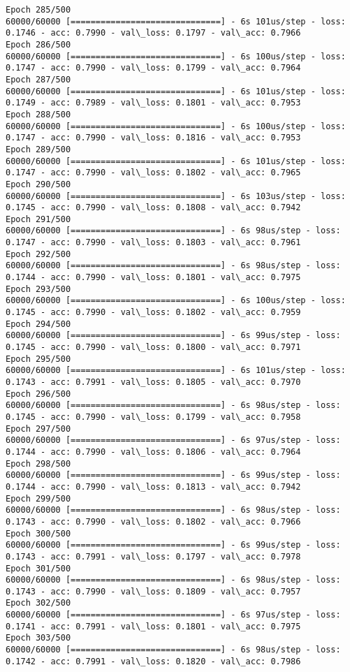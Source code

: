 \documentclass[11pt]{article}
\begin{document}
\begin{Verbatim}[commandchars=\\\{\}]
Epoch 285/500
60000/60000 [==============================] - 6s 101us/step - loss: 0.1746 - acc: 0.7990 - val\_loss: 0.1797 - val\_acc: 0.7966
Epoch 286/500
60000/60000 [==============================] - 6s 100us/step - loss: 0.1747 - acc: 0.7990 - val\_loss: 0.1799 - val\_acc: 0.7964
Epoch 287/500
60000/60000 [==============================] - 6s 101us/step - loss: 0.1749 - acc: 0.7989 - val\_loss: 0.1801 - val\_acc: 0.7953
Epoch 288/500
60000/60000 [==============================] - 6s 100us/step - loss: 0.1747 - acc: 0.7990 - val\_loss: 0.1816 - val\_acc: 0.7953
Epoch 289/500
60000/60000 [==============================] - 6s 101us/step - loss: 0.1747 - acc: 0.7990 - val\_loss: 0.1802 - val\_acc: 0.7965
Epoch 290/500
60000/60000 [==============================] - 6s 103us/step - loss: 0.1745 - acc: 0.7990 - val\_loss: 0.1808 - val\_acc: 0.7942
Epoch 291/500
60000/60000 [==============================] - 6s 98us/step - loss: 0.1747 - acc: 0.7990 - val\_loss: 0.1803 - val\_acc: 0.7961
Epoch 292/500
60000/60000 [==============================] - 6s 98us/step - loss: 0.1744 - acc: 0.7990 - val\_loss: 0.1801 - val\_acc: 0.7975
Epoch 293/500
60000/60000 [==============================] - 6s 100us/step - loss: 0.1745 - acc: 0.7990 - val\_loss: 0.1802 - val\_acc: 0.7959
Epoch 294/500
60000/60000 [==============================] - 6s 99us/step - loss: 0.1745 - acc: 0.7990 - val\_loss: 0.1800 - val\_acc: 0.7971
Epoch 295/500
60000/60000 [==============================] - 6s 101us/step - loss: 0.1743 - acc: 0.7991 - val\_loss: 0.1805 - val\_acc: 0.7970
Epoch 296/500
60000/60000 [==============================] - 6s 98us/step - loss: 0.1745 - acc: 0.7990 - val\_loss: 0.1799 - val\_acc: 0.7958
Epoch 297/500
60000/60000 [==============================] - 6s 97us/step - loss: 0.1744 - acc: 0.7990 - val\_loss: 0.1806 - val\_acc: 0.7964
Epoch 298/500
60000/60000 [==============================] - 6s 99us/step - loss: 0.1744 - acc: 0.7990 - val\_loss: 0.1813 - val\_acc: 0.7942
Epoch 299/500
60000/60000 [==============================] - 6s 98us/step - loss: 0.1743 - acc: 0.7990 - val\_loss: 0.1802 - val\_acc: 0.7966
Epoch 300/500
60000/60000 [==============================] - 6s 99us/step - loss: 0.1743 - acc: 0.7991 - val\_loss: 0.1797 - val\_acc: 0.7978
Epoch 301/500
60000/60000 [==============================] - 6s 98us/step - loss: 0.1743 - acc: 0.7990 - val\_loss: 0.1809 - val\_acc: 0.7957
Epoch 302/500
60000/60000 [==============================] - 6s 97us/step - loss: 0.1741 - acc: 0.7991 - val\_loss: 0.1801 - val\_acc: 0.7975
Epoch 303/500
60000/60000 [==============================] - 6s 98us/step - loss: 0.1742 - acc: 0.7991 - val\_loss: 0.1820 - val\_acc: 0.7986

\end{Verbatim}
\end{document}
